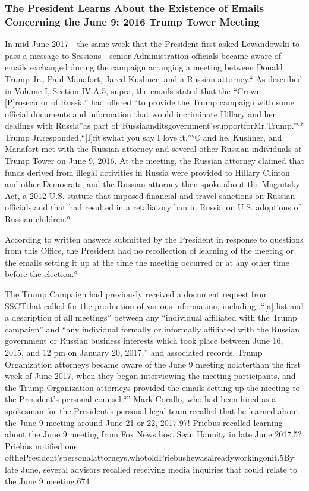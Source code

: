 \subsubsection{The President Learns About the Existence of Emails Concerning the June 9; 2016 Trump Tower Meeting}

In mid-June 2017—the same week that the President first asked Lewandowski to pass a message to Sessions—senior Administration officials became aware of emails exchanged during the campaign arranging a meeting between Donald Trump Jr., Paul Manafort, Jared Kushner, and a Russian attorney.“
As described in Volume I, Section IV.A.5, supra, the emails stated that the “Crown [P]rosecutor of Russia” had offered “to provide the Trump campaign with some official documents and information that would incriminate Hillary and her dealings with Russia”as part of“Russiaanditsgovernment'ssupportforMr.Trump.”°*
Trump Jr.responded,“[I]fit'swhat you say I love it,”°® and he, Kushner, and Manafort met with the Russian attorney and several other Russian individuals at Trump Tower on June 9, 2016.%
At the meeting, the Russian attorney claimed that funds derived from illegal activities in Russia were provided to Hillary Clinton and other Democrats, and the Russian attorney then spoke about the Magnitsky Act, a 2012 U.S. statute that imposed financial and travel sanctions on Russian officials and that had resulted in a retaliatory ban in Russia on U.S. adoptions of Russian children.°

According to written answers submitted by the President in response to questions from this Office, the President had no recollection of learning of the meeting or the emails setting it up at the time the meeting occurred or at any other time before the election.°

The Trump Campaign had previously received a document request from SSCTthat called for the production of various information, including, “[a] list and a description of all meetings” between any “individual affiliated with the Trump campaign” and “any individual formally or informally affiliated with the Russian government or Russian business interests which took place between June 16, 2015, and 12 pm on January 20, 2017,” and associated records.%
Trump Organization attorneys became aware of the June 9 meeting nolaterthan the first week of June 2017, when they began interviewing the meeting participants, and the Trump Organization attorneys provided the emails setting up the meeting to the President's personal counsel.°” Mark Corallo, who had been hired as a spokesman for the President's personal legal team,recalled that he learned about the June 9 meeting around June 21 or 22, 2017.97! Priebus recalled learning about the June 9 meeting from Fox News host Sean Hannity in late June 2017.5? Priebus notified one ofthePresident'spersonalattorneys,whotoldPriebushewasalreadyworkingonit.5By late June, several advisors recalled receiving media inquiries that could relate to the June 9 meeting.674

